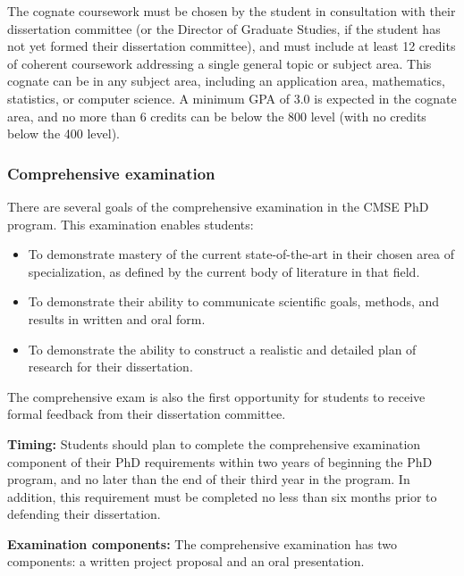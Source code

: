 The cognate coursework must be chosen by the student in consultation
with their dissertation committee (or the Director of Graduate
Studies, if the student has not yet formed their dissertation
committee), and must include at least 12 credits of coherent
coursework addressing a single general topic or subject area.  This
cognate can be in any subject area, including an application area,
mathematics, statistics, or computer science.  A minimum GPA of 3.0 is
expected in the cognate area, and no more than 6 credits can be below
the 800 level (with no credits below the 400 level).

\vspace{3mm}
\subsubsection{Comprehensive examination}
\label{sec:comp_exam}

There are several goals of the comprehensive examination in the CMSE
PhD program.  This examination enables students:

\begin{itemize}
\item To demonstrate mastery of the current state-of-the-art in their
  chosen area of specialization, as defined by the current body of
  literature in that field.

\item To demonstrate their ability to communicate scientific goals,
  methods, and results in written and oral form. 

\item To demonstrate the ability to construct a realistic and detailed
  plan of research for their dissertation.

\end{itemize}

The comprehensive exam is also the first opportunity for students to
receive formal feedback from their dissertation committee.

\vspace{2mm}
\noindent
\textbf{Timing:} Students should plan to complete the comprehensive
examination component of their PhD requirements within two years of
beginning the PhD program, and no later than the end of their third
year in the program.  In addition, this requirement must be completed
no less than six months prior to defending their dissertation. 


\vspace{2mm}
\noindent
\textbf{Examination components:} The comprehensive examination has two components: a written project proposal and an oral presentation.

